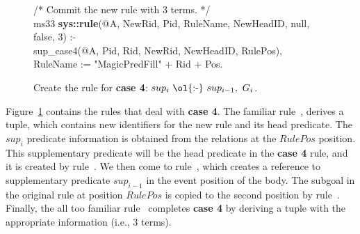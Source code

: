 \begin{figure}[!t]
\begin{boxedminipage}{\linewidth}
/* Commit the new rule with $3$ terms. */ \\
ms33 {\bf sys::rule}(@A, NewRid, Pid, RuleName, NewHeadID, null, false, 3) :- \\
\datalogspace sup\_case4(@A, Pid, Rid, NewRid, NewHeadID, RulePos), \\
\datalogspace RuleName := "MagicPredFill" + Rid + Pos.

\end{boxedminipage}
\caption{\label{ch:magic:fig:rewrite7} 
Create the rule for {\bf case 4}: $sup_i\ \text{\ol{:-}}\ sup_{i-1},\ G_i$. } 
\end{figure}

Figure~\ref{ch:magic:fig:rewrite7} contains the rules that deal with {\bf case
4}.  The familiar rule~, derives a  tuple, which
contains new identifiers for the new rule and its head predicate.  The $sup_i$
predicate information is obtained from the  relations at the $RulePos$
position.  This supplementary predicate will be the head predicate in the {\bf
case 4} rule, and it is created by rule~.  We then come to
rule~, which creates a reference to supplementary predicate
$sup_{i-1}$ in the event position of the body.  The subgoal in the original
rule at position $RulePos$ is copied to the second position by rule~.
Finally, the all too familiar rule~ completes {\bf case 4} by deriving
a  tuple with the appropriate information (i.e., $3$ terms).


